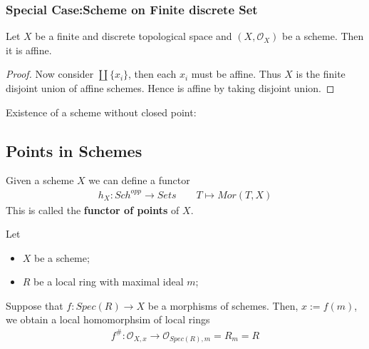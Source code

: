 \documentclass[Total.tex]{subfiles}
\begin{document}
			\subsubsection{Special Case:Scheme on Finite discrete Set}
			\begin{lemma}
				Let $X$ be a finite and discrete topological space and $(X,\mathcal{O}_X)$ be a scheme. Then it is affine.
			\end{lemma}
			\begin{proof}
				Now consider $\coprod \{x_i\}$, then each $x_i$ must be affine. Thus $X$ is the finite disjoint union of affine schemes. Hence is affine by taking disjoint union.
			\end{proof}
			\begin{example}
				Existence of a scheme without closed point:
			\end{example}
			
			\subsection{Points in Schemes}\label{Algebraic-Geometry-Points-in-Schemes}
			\begin{Def}
				Given a scheme $X$ we can define a functor
				\begin{gather*}
					h_X:Sch^{opp}\rightarrow Sets\qquad T\mapsto Mor(T,X)
				\end{gather*}
				This is called the \textbf{functor of points} of $X$. 
			\end{Def}
			Let 
			\begin{itemize}
				\item $X$ be a scheme;
				\item $R$ be a local ring with maximal ideal $m$;
			\end{itemize}
			Suppose that $f:Spec(R)\rightarrow X$ be a morphisms of schemes. Then, $x:=f(m)$, we obtain a local homomorphsim of local rings
			\begin{gather*}
				f^\#:\mathcal{O}_{X,x}\rightarrow \mathcal{O}_{Spec(R),m}=R_m=R
			\end{gather*}
			
\end{document}
